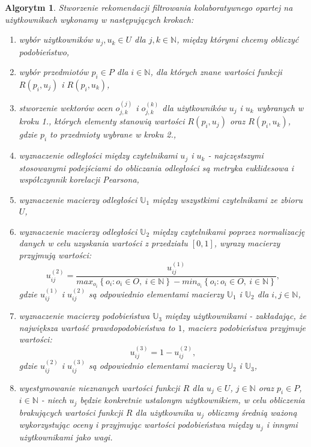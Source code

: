 \documentclass[12pt,a4paper]{report}
\newtheorem{algorytm}[df]{Algorytm}
\newcommand{\set}[1]{\left\lbrace {#1} \right\rbrace}
\newcommand{\setN}{\mathbb{N}}
\newcommand{\setUzytkownicy}{\mathit{U}}
\newcommand{\setPrzedmioty}{\mathit{P}}
\newcommand{\setOceny}{\mathit{O}}
\begin{document}
\begin{algorytm}
Stworzenie rekomendacji filtrowania kolaboratywnego opartej na użytkownikach wykonamy w następujących krokach:
\begin{enumerate}
\item wybór użytkowników $u_j, u_k \in \setUzytkownicy$ dla $j,k \in \setN$, między którymi chcemy obliczyć podobieństwo,
\item wybór przedmiotów $p_i \in \setPrzedmioty$ dla $i \in \setN$, dla których znane wartości funkcji $R(p_i,u_j)$ i $R(p_i,u_k)$,
\item stworzenie wektorów ocen $o_{j,k}^{(j)}$ i $o_{j,k}^{(k)}$ dla użytkowników $u_j$ i $u_k$ wybranych w kroku 1., których elementy stanowią wartości $R(p_i,u_j)$ oraz $R(p_i,u_k)$, gdzie $p_i$ to przedmioty wybrane w kroku 2.,
\item wyznaczenie odległości między czytelnikami $u_j$ i $u_k$ - najczęstszymi stosowanymi podejściami do obliczania odległości są metryka euklidesowa i współczynnik korelacji Pearsona,
\item wyznaczenie macierzy odległości $\mathbb{U}_1$ między wszystkimi czytelnikami ze zbioru $\setUzytkownicy$,
\item wyznaczenie macierzy odległości $\mathbb{U}_2$ między czytelnikami poprzez normalizację danych w celu uzyskania wartości z przedziału $[0,1]$, wyrazy macierzy przyjmują wartości:
$$
u_{ij}^{(2)} = \frac{u_{ij}^{(1)}}{max_{o_i} \set{o_i : o_i \in \setOceny,\: i \in \setN } - min_{o_i} \set{o_i : o_i \in \setOceny, \: i \in \setN}},
$$
gdzie $u_{ij}^{(1)}$ i $u_{ij}^{(2)}$ są odpowiednio elementami macierzy $\mathbb{U}_1$ i $\mathbb{U}_2$ dla $i,j \in \setN$,
\item wyznaczenie macierzy podobieństwa $\mathbb{U}_3$ między użytkownikami - zakładając, że największa wartość prawdopodobieństwa to $1$, macierz podobieństwa przyjmuje wartości:
$$
u_{ij}^{(3)} = 1 - u_{ij}^{(2)},
$$
gdzie $u_{ij}^{(2)}$ i $u_{ij}^{(3)}$ są odpowiednio elementami macierzy $\mathbb{U}_2$ i $\mathbb{U}_3$,
\item wyestymowanie nieznanych wartości funkcji $R$ dla $u_j \in \setUzytkownicy$, $j \in \setN$ oraz $p_i \in \setPrzedmioty$, $i \in \setN$  - niech $u_j$ będzie konkretnie ustalonym użytkownikiem, w celu obliczenia brakujących wartości funkcji $R$ dla użytkownika $u_j$ obliczmy średnią ważoną wykorzystując oceny i przyjmując wartości podobieństwa między $u_j$ i innymi użytkownikami jako wagi.
\end{enumerate}
\end{algorytm}
\end{document}
